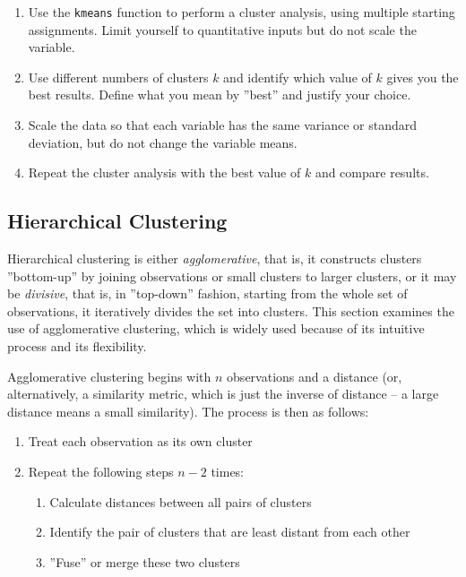 \begin{withcode}
\begin{exerciseboxcomputer}
\begin{enumerate}
   \item Use the \texttt{kmeans} function to perform a cluster analysis, using multiple starting assignments. Limit yourself to quantitative inputs but do not scale the variable.
   \item Use different numbers of clusters $k$ and identify which value of $k$ gives you the best results. Define what you mean by ''best'' and justify your choice.
   \item Scale the data so that each variable has the same variance or standard deviation, but do not change the variable means. 
   \item Repeat the cluster analysis with the best value of $k$ and compare results.
\end{enumerate}
\end{exerciseboxcomputer}
\end{withcode}

\subsection{Hierarchical Clustering}

Hierarchical clustering is either \emph{agglomerative}, that is, it constructs clusters ''bottom-up'' by joining observations or small clusters to larger clusters, or it may be \emph{divisive}, that is, in ''top-down'' fashion, starting from the whole set of observations, it iteratively divides the set into clusters. This section examines the use of agglomerative clustering, which is widely used because of its intuitive process and its flexibility.

Agglomerative clustering begins with $n$ observations and a distance (or, alternatively, a similarity metric, which is just the inverse of distance -- a large distance means a small similarity). The process is then as follows:

\begin{enumerate}
   \item Treat each observation as its own cluster
   \item Repeat the following steps $n-2$ times:
   \begin{enumerate}
      \item Calculate distances between all pairs of clusters
      \item Identify the pair of clusters that are least distant from each other
      \item ''Fuse'' or merge these two clusters
   \end{enumerate}
\end{enumerate}

